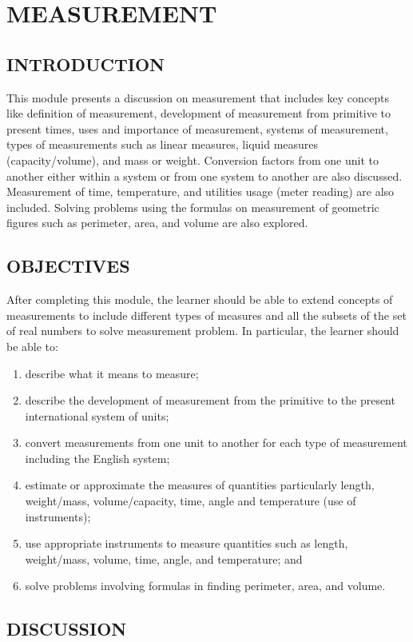 \chapter{MEASUREMENT}\label{chap:3}

\section*{INTRODUCTION}
This module presents a discussion on measurement that includes key concepts like definition
of measurement, development of measurement from primitive to present times, uses and
importance of measurement, systems of measurement, types of measurements such as linear
measures, liquid measures (capacity/volume), and mass or weight. Conversion factors from one unit
to another either within a system or from one system to another are also discussed. Measurement
of time, temperature, and utilities usage (meter reading) are also included. Solving problems using
the formulas on measurement of geometric figures such as perimeter, area, and volume are also
explored.
\section*{OBJECTIVES}
After completing this module, the learner should be able to extend concepts of measurements
to include different types of measures and all the subsets of the set of real numbers to solve
measurement problem. In particular, the learner should be able to:
\begin{enumerate}
\item describe what it means to measure;
\item describe the development of measurement from the primitive to the present international
system of units;
\item convert measurements from one unit to another for each type of measurement including
the English system;
\item estimate or approximate the measures of quantities particularly length, weight/mass,
volume/capacity, time, angle and temperature (use of instruments);
\item use appropriate instruments to measure quantities such as length, weight/mass, volume,
time, angle, and temperature; and
\item solve problems involving formulas in finding perimeter, area, and volume.
\end{enumerate}
\section*{DISCUSSION}
